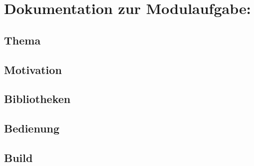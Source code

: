 \documentclass[a4paper,12pt]{book}
\begin{document}
\chapter*{Dokumentation zur Modulaufgabe:}

\section*{Thema}

\section*{Motivation}

\section*{Bibliotheken}

\section*{Bedienung}

\section*{Build}
\end{document}
